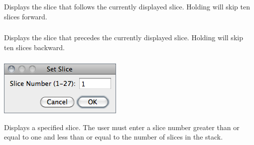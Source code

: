 \subsubsection{\protect{}\label{sub:Next-Slice-[>]}}

Displays the slice that follows the currently displayed slice. Holding
 \mykeystroke{>} will skip ten slices forward.




\subsubsection{\protect{}\label{sub:Previous-Slice-[>]}}

Displays the slice that precedes the currently displayed slice. Holding
 \mykeystroke{<} will skip ten slices backward.




\subsubsection{\protect{}\label{sub:Set-Slice...}}

\begin{minipage}[c][1\totalheight][t]{0.33\columnwidth}%
\includegraphics[scale=0.55]{images/SetSlice}%
\end{minipage}%
\begin{minipage}[c][1\totalheight][t]{0.67\columnwidth}%
Displays a specified slice. The user must enter a slice number greater
than or equal to one and less than or equal to the number of slices
in the stack.%
\end{minipage}


\subsubsection{\protect{}\label{sub:Images-To-Stack}}

